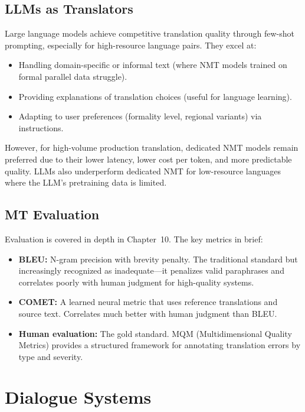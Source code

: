 \subsection{LLMs as Translators}

Large language models achieve competitive translation quality through few-shot prompting,
especially for high-resource language pairs.  They excel at:
\begin{itemize}
    \item Handling domain-specific or informal text (where NMT models trained on formal
          parallel data struggle).
    \item Providing explanations of translation choices (useful for language learning).
    \item Adapting to user preferences (formality level, regional variants) via instructions.
\end{itemize}

However, for high-volume production translation, dedicated NMT models remain preferred due to
their lower latency, lower cost per token, and more predictable quality.  LLMs also
underperform dedicated NMT for low-resource languages where the LLM's pretraining data
is limited.

\subsection{MT Evaluation}

Evaluation is covered in depth in Chapter~10.  The key metrics in brief:

\begin{itemize}
    \item \textbf{BLEU:} N-gram precision with brevity penalty.  The traditional standard but
          increasingly recognized as inadequate---it penalizes valid paraphrases and correlates
          poorly with human judgment for high-quality systems.
    \item \textbf{COMET:} A learned neural metric that uses reference translations and source
          text.  Correlates much better with human judgment than BLEU.
    \item \textbf{Human evaluation:} The gold standard.  MQM (Multidimensional Quality Metrics)
          provides a structured framework for annotating translation errors by type and severity.
\end{itemize}

\section{Dialogue Systems}
\label{sec:dialogue_systems}

